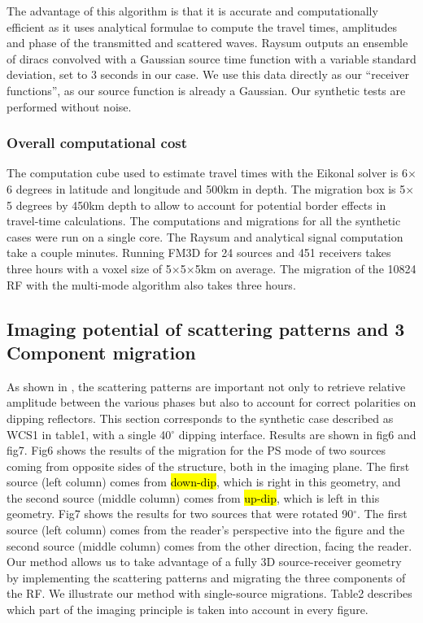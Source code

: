 \documentclass[9pt,a4paper]{article}
\numberwithin{equation}{section}
\begin{document}
\begin{multicols}{2}
The advantage of this algorithm is that it is accurate and computationally efficient as it uses analytical formulae to compute the travel times, amplitudes and phase of the transmitted and scattered waves.
Raysum outputs an ensemble of diracs convolved with a Gaussian source time function with a variable standard deviation, set to 3 seconds in our case.
We use this data directly as our “receiver functions”, as our source function is already a Gaussian.
Our synthetic tests are performed without noise.

\subsubsection{Overall computational cost}

The computation cube used to estimate travel times with the Eikonal solver is 6$\times$6 degrees in latitude and longitude and 500km in depth.
The migration box is 5$\times$5 degrees by 450km depth to allow to account for potential border effects in travel-time calculations.
The computations and migrations for all the synthetic cases were run on a single core.
The Raysum and analytical signal computation take a couple minutes.
Running FM3D for 24 sources and 451 receivers takes three hours with a voxel size of 5$\times$5$\times$5km on average.
The migration of the 10824 RF with the multi-mode algorithm also takes three hours.

\subsection{Imaging potential of scattering patterns and 3 Component migration}

As shown in \cite{cheng_gji_16}, the scattering patterns are important not only to retrieve relative amplitude between the various phases but also to account for correct polarities on dipping reflectors.
This section corresponds to the synthetic case described as WCS1 in table1, with a single 40$^{\circ}$ dipping interface.
Results are shown in fig6 and fig7.
Fig6 shows the results of the migration for the PS mode of two sources coming from opposite sides of the structure, both in the imaging plane.
The first source (left column) comes from \hl{down-dip}, which is right in this geometry, and the second source (middle column) comes from \hl{up-dip}, which is left in this geometry.
Fig7 shows the results for two sources that were rotated 90$^{\circ}$.
The first source (left column) comes from the reader's perspective into the figure and the second source (middle column) comes from the other direction, facing the reader.
Our method allows us to take advantage of a fully 3D source-receiver geometry by implementing the scattering patterns and migrating the three components of the RF.
We illustrate our method with single-source migrations.
Table2 describes which part of the imaging principle is taken into account in every figure.


\end{multicols}
\end{document}
